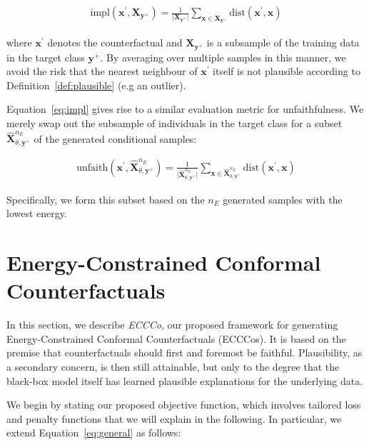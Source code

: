 \documentclass{article}
\begin{document}
\begin{equation}\label{eq:impl}
  \begin{aligned}
    \text{impl}(\mathbf{x}^{\prime},\mathbf{X}_{\mathbf{y}^+}) = \frac{1}{\lvert\mathbf{X}_{\mathbf{y}^+}\rvert} \sum_{\mathbf{x} \in \mathbf{X}_{\mathbf{y}^+}} \text{dist}(\mathbf{x}^{\prime},\mathbf{x})
  \end{aligned}
\end{equation}

where $\mathbf{x}^{\prime}$ denotes the counterfactual and $\mathbf{X}_{\mathbf{y}^+}$ is a subsample of the training data in the target class $\mathbf{y}^+$. By averaging over multiple samples in this manner, we avoid the risk that the nearest neighbour of $\mathbf{x}^{\prime}$ itself is not plausible according to Definition~\ref{def:plausible} (e.g an outlier).

Equation~\ref{eq:impl} gives rise to a similar evaluation metric for unfaithfulness. We merely swap out the subsample of individuals in the target class for a subset $\hat{\mathbf{X}}^{n_E}_{\theta,\mathbf{y}^+}$ of the generated conditional samples:

\begin{equation}\label{eq:faith}
  \begin{aligned}
    \text{unfaith}(\mathbf{x}^{\prime},\hat{\mathbf{X}}^{n_E}_{\theta,\mathbf{y}^+}) = \frac{1}{\lvert \hat{\mathbf{X}}^{n_E}_{\theta,\mathbf{y}^+}\rvert} \sum_{\mathbf{x} \in \hat{\mathbf{X}}^{n_E}_{\theta,\mathbf{y}^+}} \text{dist}(\mathbf{x}^{\prime},\mathbf{x})
  \end{aligned}
\end{equation}

Specifically, we form this subset based on the $n_E$ generated samples with the lowest energy. 

\section{Energy-Constrained Conformal Counterfactuals}\label{meth}

In this section, we describe \textit{ECCCo}, our proposed framework for generating Energy-Constrained Conformal Counterfactuals (ECCCos). It is based on the premise that counterfactuals should first and foremost be faithful. Plausibility, as a secondary concern, is then still attainable, but only to the degree that the black-box model itself has learned plausible explanations for the underlying data. 

We begin by stating our proposed objective function, which involves tailored loss and penalty functions that we will explain in the following. In particular, we extend Equation~\ref{eq:general} as follows:
\end{document}

